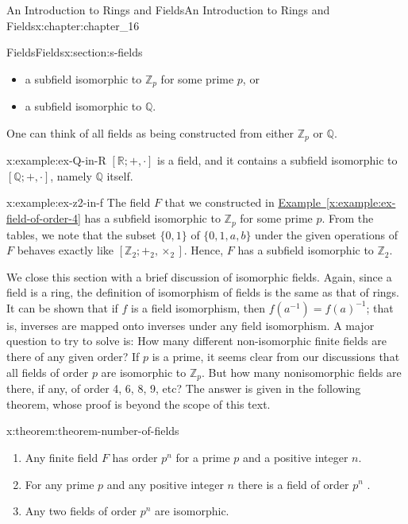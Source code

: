 \documentclass[oneside,10pt,]{book}
\newcommand{\xreffont}{\relax}
\numberwithin{equation}{section}
\begin{document}
\begin{chapterptx}{An Introduction to Rings and Fields}{}{An Introduction to Rings and Fields}{}{}{x:chapter:chapter_16}
\begin{sectionptx}{Fields}{}{Fields}{}{}{x:section:s-fields}
\begin{itemize}[label=\textbullet]
\item{}a subfield isomorphic to \(\mathbb{Z}_p\) for some prime \(p\), or%
\item{}a subfield isomorphic to \(\mathbb{Q}\).%
\end{itemize}
%
\par
One can think of all fields as being constructed from either \(\mathbb{Z}_p\) or \(\mathbb{Q}\).%
\begin{example}{}{x:example:ex-Q-in-R}%
\([\mathbb{R}; +, \cdot]\) is a field, and it contains a subfield isomorphic to \([\mathbb{Q}; +, \cdot]\), namely \(\mathbb{Q}\) itself.%
\end{example}
\begin{example}{}{x:example:ex-z2-in-f}%
The field \(F\) that we constructed in \hyperref[x:example:ex-field-of-order-4]{Example~{\xreffont\ref{x:example:ex-field-of-order-4}}} has a subfield isomorphic to \(\mathbb{Z}_p\) for some prime \(p\).  From the tables, we note that the subset \(\{0, 1\}\) of \(\{0, 1, a, b\}\) under the given operations of \(F\) behaves exactly like \(\left[\mathbb{Z}_2; +_2,\times _2\right]\).  Hence, \(F\) has a subfield isomorphic to \(\mathbb{Z}_2\).%
\end{example}
We close this section with a brief discussion of isomorphic fields. Again, since a field is a ring, the definition of isomorphism of fields is the same as that of rings. It can be shown that if \(f\) is a field isomorphism, then \(f\left(a^{-1} \right) = f(a)^{-1}\); that is, inverses are mapped onto inverses under any field isomorphism. A major question to try to solve is: How many different non-isomorphic finite fields are there of any given order? If \(p\) is a prime, it seems clear from our discussions that all fields of order \(p\) are isomorphic to \(\mathbb{Z}_p\). But how many nonisomorphic fields are there, if any, of order 4, 6, 8, 9, etc? The answer is given in the following theorem, whose proof is beyond the scope of this text.%
\begin{theorem}{}{}{x:theorem:theorem-number-of-fields}%
%
\begin{enumerate}[label=(\arabic*)]
\item{}Any finite field \(F\) has order \(p^n\) for a prime \(p\) and a positive integer \(n\).%
\item{}For any prime \(p\) and any positive integer \(n\) there is a field of order \(p^n\) .%
\item{}Any two fields of order \(p^n\) are isomorphic.%
\end{enumerate}

\end{theorem}
\end{sectionptx}
\end{chapterptx}
\end{document}

